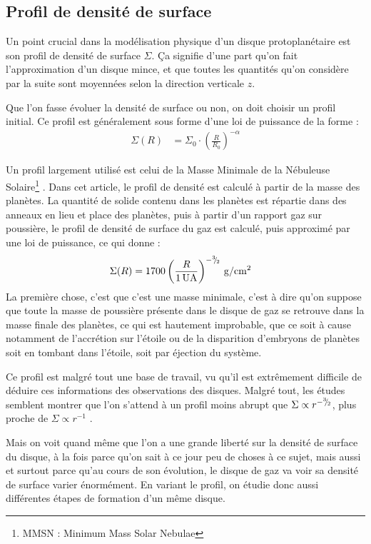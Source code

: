 \subsection{Profil de densité de surface}
Un point crucial dans la modélisation physique d'un disque protoplanétaire est son profil de densité de surface $\Sigma$. Ça signifie d'une part qu'on fait l'approximation d'un disque mince, et que toutes les quantités qu'on considère par la suite sont moyennées selon la direction verticale $z$.

Que l'on fasse évoluer la densité de surface ou non, on doit choisir un profil initial. Ce profil est généralement sous forme d'une loi de puissance de la forme : 
\begin{align}
\Sigma(R) &= \Sigma_0 \cdot \left(\frac{R}{R_0}\right)^{-\alpha}
\end{align}

Un profil largement utilisé est celui de la Masse Minimale de la Nébuleuse Solaire\footnote{MMSN : Minimum Mass Solar Nebulae} \citep{weidenschilling1977distribution, hayashi1981structure}. Dans cet article, le profil de densité est calculé à partir de la masse des planètes. La quantité de solide contenu dans les planètes est répartie dans des anneaux en lieu et place des planètes, puis à partir d'un rapport gaz sur poussière, le profil de densité de surface du gaz est calculé, puis approximé par une loi de puissance, ce qui donne : 
\begin{align}
\Sigma(R) &= 1700 \left(\frac{R}{1\mathrm{\thinspace UA}}\right)^{-{{}^{3\!\!}/ _{\!2}}} \mathrm{\thinspace g/cm^2}
\end{align}
La première chose, c'est que c'est une masse minimale, c'est à dire qu'on suppose que toute la masse de poussière présente dans le disque de gaz se retrouve dans la masse finale des planètes, ce qui est hautement improbable, que ce soit à cause notamment de l'accrétion sur l'étoile ou de la disparition d'embryons de planètes soit en tombant dans l'étoile, soit par éjection du système.

Ce profil est malgré tout une base de travail, vu qu'il est extrêmement difficile de déduire ces informations des observations des disques. Malgré tout, les études semblent montrer que l'on s'attend à un profil moins abrupt que $\Sigma\propto r^{-{{}^{3\!\!}/ _{\!2}}}$, plus proche de $\Sigma\propto r^{-1}$ \citep{bell1997structure}.

Mais on voit quand même que l'on a une grande liberté sur la densité de surface du disque, à la fois parce qu'on sait à ce jour peu de choses à ce sujet, mais aussi et surtout parce qu'au cours de son évolution, le disque de gaz va voir sa densité de surface varier énormément. En variant le profil, on étudie donc aussi différentes étapes de formation d'un même disque. 

